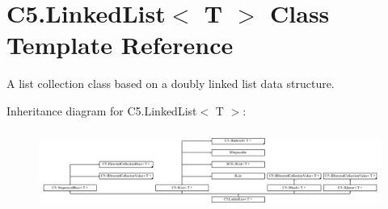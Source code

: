 \hypertarget{class_c5_1_1_linked_list}{}\section{C5.\+Linked\+List$<$ T $>$ Class Template Reference}
\label{class_c5_1_1_linked_list}


A list collection class based on a doubly linked list data structure.  


Inheritance diagram for C5.\+Linked\+List$<$ T $>$\+:\begin{figure}[H]
\begin{center}
\leavevmode
\includegraphics[height=2.629108cm]{class_c5_1_1_linked_list}
\end{center}
\end{figure}
